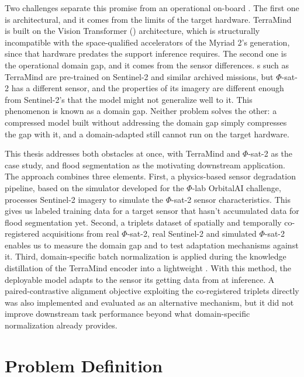 Two challenges separate this promise from an operational on-board .
The first one is architectural, and it comes from the limits of the target hardware.
TerraMind is built on the Vision Transformer ()\cite{dosovitskiy2020image} architecture, which is structurally incompatible with the space-qualified accelerators of the Myriad 2's generation\cite{myriad2}, since that hardware predates the support  inference requires.
The second one is the operational domain gap, and it comes from the sensor differences.
s such as TerraMind are pre-trained on Sentinel-2 and similar archived missions, but $\Phi$-sat-2 has a different sensor, and the properties of its imagery are different enough from Sentinel-2's that the model might not generalize well to it.
This phenomenon is known as a domain gap\cite{bendavid2010theory}.
Neither problem solves the other: a compressed model built without addressing the domain gap simply compresses the gap with it, and a domain-adapted  still cannot run on the target hardware.

This thesis addresses both obstacles at once, with TerraMind and $\Phi$-sat-2 as the case study, and flood segmentation as the motivating downstream application.
The approach combines three elements.
First, a physics-based sensor degradation pipeline, based on the simulator developed for the  $\Phi$-lab OrbitalAI challenge\cite{longepe2024orbitalai}, processes Sentinel-2 imagery to simulate the $\Phi$-sat-2 sensor characteristics.
This gives us labeled training data for a target sensor that hasn't accumulated data for flood segmentation yet.
Second, a triplets dataset of spatially and temporally co-registered acquisitions from real $\Phi$-sat-2, real Sentinel-2 and simulated $\Phi$-sat-2 enables us to measure the domain gap and to test adaptation mechanisms against it.
Third, domain-specific batch normalization\cite{chang2019dsbn} is applied during the knowledge distillation\cite{hinton2015distilling} of the TerraMind encoder into a lightweight . With this method, the deployable model adapts to the sensor its getting data from at inference.
A paired-contrastive alignment objective exploiting the co-registered triplets directly was also implemented and evaluated as an alternative mechanism, but it did not improve downstream task performance beyond what domain-specific normalization already provides.

\section{Problem Definition}
\label{sec:problem-definition}

